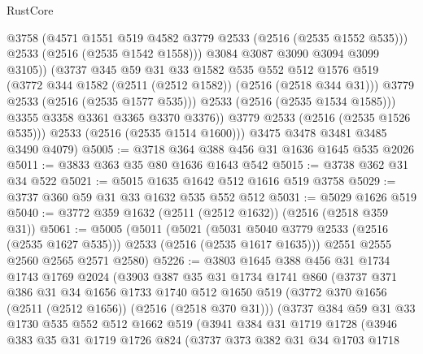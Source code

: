 \begin{lexlean}{RustCore}
\begin{coremodule}
                      @3758
                      (@4571 @1551 @519 @4582 @3779 @2533 (@2516 (@2535 @1552 @535)))
                      @2533
                      (@2516 (@2535 @1542 @1558)))
                    @3084
                    @3087
                    @3090
                    @3094
                    @3099
                    @3105))
                (@3737
                  @345
                  @59
                  @31
                  @33
                  @1582
                  @535
                  @552
                  @512
                  @1576
                  @519
                  (@3772 @344 @1582 (@2511 (@2512 @1582)) (@2516 (@2518 @344 @31)))
                  @3779
                  @2533
                  (@2516 (@2535 @1577 @535)))
                @2533
                (@2516 (@2535 @1534 @1585)))
              @3355
              @3358
              @3361
              @3365
              @3370
              @3376))
          @3779
          @2533
          (@2516 (@2535 @1526 @535)))
        @2533
        (@2516 (@2535 @1514 @1600)))
      @3475
      @3478
      @3481
      @3485
      @3490
      @4079)
@5005 := @3718 @364 @388 @456 @31 @1636 @1645 @535 @2026
@5011 := @3833 @363 @35 @80 @1636 @1643 @542
@5015 := @3738 @362 @31 @34 @522
@5021 := @5015 @1635 @1642 @512 @1616 @519 @3758
@5029 := @3737 @360 @59 @31 @33 @1632 @535 @552 @512
@5031 := @5029 @1626 @519
@5040 := @3772 @359 @1632 (@2511 (@2512 @1632)) (@2516 (@2518 @359 @31))
@5061 := @5005
    (@5011
      (@5021 (@5031 @5040 @3779 @2533 (@2516 (@2535 @1627 @535))) @2533 (@2516 (@2535 @1617 @1635)))
      @2551
      @2555
      @2560
      @2565
      @2571
      @2580)
@5226 := @3803
    @1645
    @388
    @456
    @31
    @1734
    @1743
    @1769
    @2024
    (@3903
      @387
      @35
      @31
      @1734
      @1741
      @860
      (@3737
        @371
        @386
        @31
        @34
        @1656
        @1733
        @1740
        @512
        @1650
        @519
        (@3772 @370 @1656 (@2511 (@2512 @1656)) (@2516 (@2518 @370 @31)))
        (@3737
          @384
          @59
          @31
          @33
          @1730
          @535
          @552
          @512
          @1662
          @519
          (@3941
            @384
            @31
            @1719
            @1728
            (@3946
              @383
              @35
              @31
              @1719
              @1726
              @824
              (@3737
                @373
                @382
                @31
                @34
                @1703
                @1718

\end{coremodule}
\end{lexlean}

